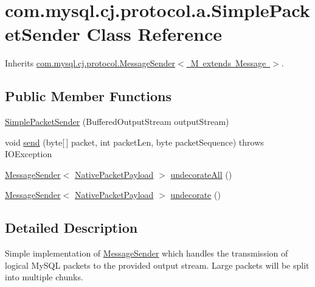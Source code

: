 \hypertarget{classcom_1_1mysql_1_1cj_1_1protocol_1_1a_1_1_simple_packet_sender}{}\section{com.\+mysql.\+cj.\+protocol.\+a.\+Simple\+Packet\+Sender Class Reference}
\label{classcom_1_1mysql_1_1cj_1_1protocol_1_1a_1_1_simple_packet_sender}


Inherits \mbox{\hyperlink{interfacecom_1_1mysql_1_1cj_1_1protocol_1_1_message_sender}{com.\+mysql.\+cj.\+protocol.\+Message\+Sender$<$ M extends Message $>$}}.

\subsection*{Public Member Functions}
\begin{DoxyCompactItemize}
\item 
\mbox{\hyperlink{classcom_1_1mysql_1_1cj_1_1protocol_1_1a_1_1_simple_packet_sender_a0cfdd0d43649fedca7f4ba2fccb983ce}{Simple\+Packet\+Sender}} (Buffered\+Output\+Stream output\+Stream)
\item 
void \mbox{\hyperlink{classcom_1_1mysql_1_1cj_1_1protocol_1_1a_1_1_simple_packet_sender_a88b66f65476a850c58ffa47bc862661e}{send}} (byte\mbox{[}$\,$\mbox{]} packet, int packet\+Len, byte packet\+Sequence)  throws I\+O\+Exception 
\item 
\mbox{\hyperlink{interfacecom_1_1mysql_1_1cj_1_1protocol_1_1_message_sender}{Message\+Sender}}$<$ \mbox{\hyperlink{classcom_1_1mysql_1_1cj_1_1protocol_1_1a_1_1_native_packet_payload}{Native\+Packet\+Payload}} $>$ \mbox{\hyperlink{classcom_1_1mysql_1_1cj_1_1protocol_1_1a_1_1_simple_packet_sender_a2fa36445cf29dff6e32000dc6c95c831}{undecorate\+All}} ()
\item 
\mbox{\hyperlink{interfacecom_1_1mysql_1_1cj_1_1protocol_1_1_message_sender}{Message\+Sender}}$<$ \mbox{\hyperlink{classcom_1_1mysql_1_1cj_1_1protocol_1_1a_1_1_native_packet_payload}{Native\+Packet\+Payload}} $>$ \mbox{\hyperlink{classcom_1_1mysql_1_1cj_1_1protocol_1_1a_1_1_simple_packet_sender_a7258a5245f263cf4635daba8be258e36}{undecorate}} ()
\end{DoxyCompactItemize}


\subsection{Detailed Description}
Simple implementation of \mbox{\hyperlink{interfacecom_1_1mysql_1_1cj_1_1protocol_1_1_message_sender}{Message\+Sender}} which handles the transmission of logical My\+S\+QL packets to the provided output stream. Large packets will be split into multiple chunks. 

